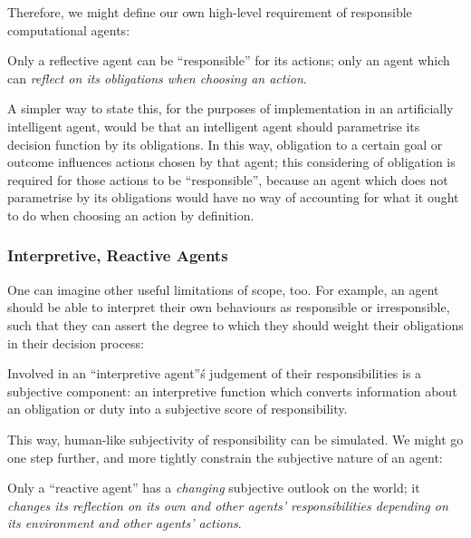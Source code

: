 Therefore, we might define our own high-level requirement of responsible computational agents:

\begin{displayquote}
    Only a reflective agent can be ``responsible'' for its actions; only an agent which can \emph{reflect on its obligations when choosing an action}.
\end{displayquote}\par

A simpler way to state this, for the purposes of implementation in an artificially intelligent agent, would be that an intelligent agent should parametrise its decision function by its obligations. In this way, obligation to a certain goal or outcome influences actions chosen by that agent; this considering of obligation is required for those actions to be ``responsible'', because an agent which does not parametrise by its obligations would have no way of accounting for what it ought to do when choosing an action by definition.\par

\subsubsection{Interpretive, Reactive Agents}
One can imagine other useful limitations of scope, too. For example, an agent should be able to interpret their own behaviours as responsible or irresponsible, such that they can assert the degree to which they should weight their obligations in their decision process:\par

\begin{displayquote}
    Involved in an ``interpretive agent''\'s judgement of their responsibilities is a subjective component: an interpretive function which converts information about an obligation or duty into a subjective score of responsibility.
\end{displayquote}\par

This way, human-like subjectivity of responsibility can be simulated. We might go one step further, and more tightly constrain the subjective nature of an agent:\par

\begin{displayquote}
    Only a ``reactive agent'' has a \emph{changing} subjective outlook on the world; it \emph{changes its reflection on its own and other agents' responsibilities depending on its environment and other agents' actions}.
\end{displayquote}\par

